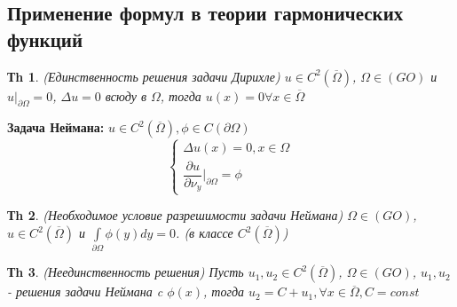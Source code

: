 \documentclass[14pt]{article}
\theoremstyle{plain}
\newtheorem{Thm}{Тh}
\theoremstyle{definition}
\begin{document}
		\subsection{Применение формул в теории гармонических функций}
			\begin{Thm}
				(Единственность решения задачи Дирихле)\newline
				$u\in C^2(\overline{\Omega})$, $\Omega \in (GO)$ и $u|_{\partial \Omega} =0$, $\Delta u = 0$ всюду в $\Omega$,   тогда $u(x) = 0 \forall x \in \overline{\Omega}$
			\end{Thm}
			\textbf{Задача Неймана:}\newline
			$u \in C^2(\overline{\Omega}), \phi \in C(\partial \Omega)$
			\begin{equation*}
				\left\{ 
				\begin{array}{ll} 
					\Delta u(x) = 0, x\in \Omega \\
					\dfrac{\partial u}{\partial \nu_y}|_{\partial \Omega} = \phi \end{array}\right.
			\end{equation*}
			\begin{Thm}
				(Необходимое условие разрешимости задачи Неймана)\newline
				$\Omega \in (GO)$, $u\in C^2(\overline{\Omega})$ и $\int\limits_{\partial \Omega} \phi(y) dy = 0$. (в классе $C^2(\overline{\Omega})$)
			\end{Thm}
			\begin{Thm}
				(Неединственность решения)\newline
				Пусть $u_1, u_2 \in C^2(\overline{\Omega})$, $\Omega \in (GO)$, $u_1, u_2$ - решения задачи Неймана c $\phi(x)$, тогда $u_2 = C + u_1, \forall x \in \overline{\Omega},  C = const$	
			\end{Thm}
\end{document}
